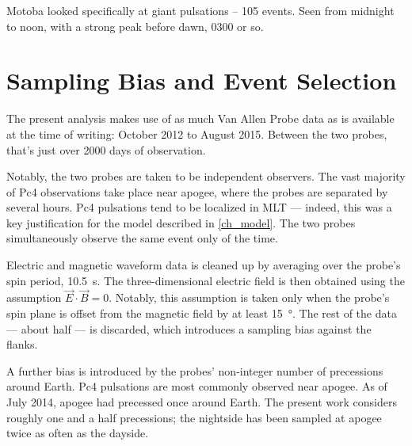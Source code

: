 Motoba\cite{motoba_2015} looked specifically at giant pulsations -- 105 events. Seen from midnight to noon, with a strong peak before dawn, 0300 or so. 


\section{Sampling Bias and Event Selection}
  \label{sec_selection}

The present analysis makes use of as much Van Allen Probe data as is available at the time of writing: October 2012 to August 2015. Between the two probes, that's just over 2000 days of observation. 

Notably, the two probes are taken to be independent observers. The vast majority of Pc4 observations take place near apogee, where the probes are separated by several hours. Pc4 pulsations tend to be localized in MLT --- indeed, this was a key justification for the model described in \cref{ch_model}. The two probes simultaneously observe the same event only \todo{$\cdots$} of the time. 


Electric and magnetic waveform data is cleaned up by averaging over the probe's spin period, \SI{10.5}{\s}. The three-dimensional electric field is then obtained using the assumption $\vec{E} \cdot \vec{B} = 0$. Notably, this assumption is taken only when the probe's spin plane is offset from the magnetic field by at least \SI{15}{\degree}. The rest of the data --- about half --- is discarded, which introduces a sampling bias against the flanks. 

A further bias is introduced by the probes' non-integer number of precessions around Earth. Pc4 pulsations are most commonly observed near apogee. As of July 2014, apogee had precessed once around Earth\cite{dai_2015}. The present work considers roughly one and a half precessions; the nightside has been sampled at apogee twice as often as the dayside. 

